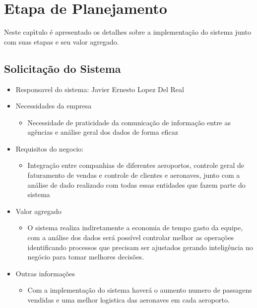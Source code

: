 
\chapter{Etapa de Planejamento}


Neste cap\'{\i}tulo \'{e} apresentado os detalhes sobre a implementação
do sistema junto com suas etapas e seu valor agregado.


\section{Solicita\c{c}\~{a}o do Sistema}

\begin{itemize}
       \item Responsavel do sistema: Javier Ernesto Lopez Del Real
       \item Necessidades da empresa
             \begin{itemize}
                    \item Necessidade de praticidade da comunicação de informação entre as agências e análise geral dos dados de forma eficaz
             \end{itemize}
       \item Requisitos do negocio:
             \begin{itemize}
                    \item Integração entre companhias de diferentes aeroportos, controle geral de faturamento de vendas e controle de clientes e aeronaves, junto com a análise de dado realizado com todas essas entidades que fazem parte do sistema
             \end{itemize}
       \item Valor agregado
             \begin{itemize}
                    \item O sistema realiza indiretamente a economia de tempo gasto da equipe, com a análise dos dados será possível controlar melhor as operações identificando processos que precisam ser ajustados gerando inteligência no negócio para tomar melhores decisões.
             \end{itemize}
       \item Outras informações
             \begin{itemize}
                    \item Com a implementação do sistema haverá o aumento
                          numero de passagens vendidas e uma melhor logistica das aeronaves
                          em cada aeroporto.
                          
             \end{itemize}
\end{itemize}


